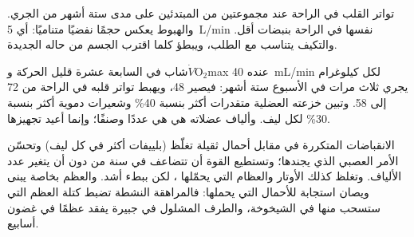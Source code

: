 \begin{omfigure}

{\small تواتر القلب في الراحة عند مجموعتين من المبتدئين على مدى ستة
أشهر من الجري. والهبوط يعكس حجمًا نفضيًا متناميًا: أي \qty{5}{L/min}
نفسها في الراحة بنبضات أقل. والتكيف يتناسب مع الطلب، ويبطؤ كلما اقترب
الجسم من حاله الجديدة.}
\end{omfigure}

\begin{example}\label{ex:g10:sport-and-health:numbers}
شاب في السابعة عشرة قليل الحركة و$\dot V\!\mathrm{O_2}$max عنده
\qty{40}{mL/min} لكل كيلوغرام يجري ثلاث مرات في الأسبوع ستة أشهر:
فيصير \num{48}، ويهبط تواتر قلبه في الراحة من 72 إلى 58. وتبين خزعته
العضلية متقدرات أكثر بنسبة 40\% وشعيرات دموية أكثر بنسبة 30\% لكل
ليف. وألياف عضلاته هي هي عددًا وصنفًا؛ وإنما أعيد تجهيزها.
\end{example}

\begin{proposition}\label{prop:g10:sport-and-health:strength}
الانقباضات المتكررة في مقابل أحمال ثقيلة تغلّظ 
(بلييفات أكثر في كل ليف) وتحسّن الأمر العصبي الذي يجندها؛ وتستطيع
القوة أن تتضاعف في سنة من دون أن يتغير عدد الألياف. وتغلظ كذلك
الأوتار والعظام التي يحمّلها ، لكن ببطء أشد. والعظم بخاصة يبنى
ويصان استجابة للأحمال التي يحملها: فالمراهقة النشطة تضبط كتلة العظم
التي ستسحب منها في الشيخوخة، والطرف المشلول في جبيرة يفقد عظمًا في
غضون أسابيع.
\end{proposition}
\admitted

